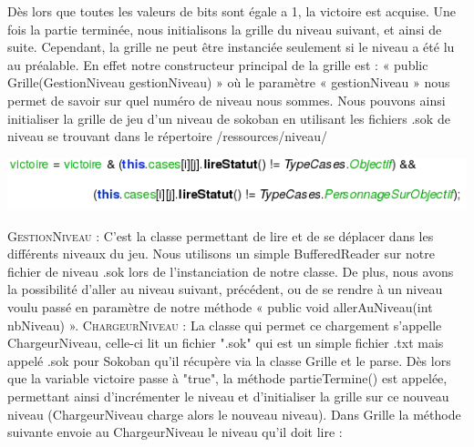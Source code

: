 \documentclass[a4paper,12pt]{article} %
\begin{document}
\newline
Dès lors que toutes les valeurs de bits sont égale a 1, la victoire est acquise.
\newline
Une fois la partie terminée, nous initialisons la grille du niveau suivant, et ainsi de suite.
\newline
Cependant, la grille ne peut être instanciée seulement si le niveau a été lu au préalable. En effet notre constructeur principal de la grille est : « public Grille(GestionNiveau gestionNiveau) » où le paramètre « gestionNiveau » nous permet de savoir sur quel numéro de niveau nous sommes.
Nous pouvons ainsi initialiser la grille de jeu d’un niveau de sokoban en utilisant les fichiers .sok de niveau se trouvant dans le répertoire /ressources/niveau/

\begin{center} \includegraphics[scale=1]{code1.png} \end{center}
\newpage
\noindent
\textsc{GestionNiveau :}
\newline\newline
C'est la classe permettant de lire et de se déplacer dans les différents niveaux du jeu.
Nous utilisons un simple BufferedReader sur notre fichier de niveau .sok lors de l’instanciation de notre classe.
De plus, nous avons la possibilité d’aller au niveau suivant, précédent, ou de se rendre à un niveau voulu passé en paramètre de notre méthode « public void allerAuNiveau(int nbNiveau) ».
\noindent
\newline\newline
\textsc{ChargeurNiveau :}
\newline\newline
La classe qui permet ce chargement s’appelle ChargeurNiveau, celle-ci lit un fichier ".sok" qui est un simple fichier .txt mais appelé .sok pour Sokoban qu’il récupère via la classe Grille et le parse. Dès lors que la variable victoire passe à "true", la méthode partieTermine() est appelée, permettant ainsi d’incrémenter le niveau et d’initialiser la grille sur ce nouveau niveau (ChargeurNiveau charge alors le nouveau niveau).
\newline
Dans Grille la méthode suivante envoie au ChargeurNiveau le niveau qu’il doit lire :
\newline
\end{document}
